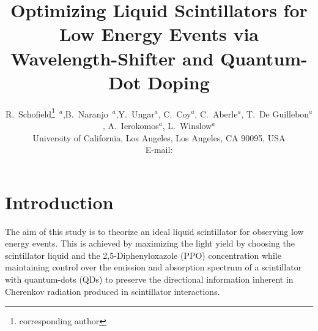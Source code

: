 \documentclass{JINST}
\title{Optimizing Liquid Scintillators for Low Energy Events via Wavelength-Shifter and Quantum-Dot Doping}
\author{R.~Schofield\setcounter{footnote}{0}\thanks{corresponding author}~$^a$,B.~Naranjo~$^a$,Y.~Ungar$^a$, C.~Coy$^a$, C.~Aberle$^a$, T.~De Guillebon$^a$, A.~Ierokomos$^a$, L.~Winslow$^a$\\
\llap{$^a$}University of California, Los Angeles, Los Angeles, CA 90095, USA\\
E-mail: \email{rschofield@physics.ucla.edu}}
\begin{document}
\section{Introduction}\label{intro}
 The aim of this study is to theorize an ideal liquid scintillator for observing low energy events. This is achieved by maximizing the light yield by choosing the scintillator liquid and the 2,5-Diphenyloxazole (PPO) concentration while maintaining control over the emission and absorption spectrum of a scintillator with quantum-dots (QDs) to preserve the directional information inherent in Cherenkov radiation produced in scintillator interactions.
 


\end{document}

